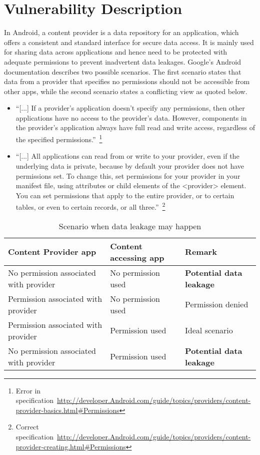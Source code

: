 \section{Vulnerability Description}
\label{vuln}
\noindent
In Android, a content provider is a data repository for an application, which offers a consistent and standard interface for secure data access. It is mainly used for sharing data across applications and hence need to be protected with adequate permissions to prevent inadvertent data leakages. Google's Android documentation describes two possible scenarios. The first scenario states that data from a provider that specifies no permissions should not be accessible from other apps, while the second scenario states a conflicting view as quoted below.
\begin{itemize}
 \item ``[...] If a provider's application doesn't specify any permissions, then other applications have no access to the provider's data. However, components in the provider's application always have full read and write access, regardless of the specified permissions.''~\footnote{Error in specification~\url{http://developer.Android.com/guide/topics/providers/content-provider-basics.html#Permissions}}
 \item ``[...] All applications can read from or write to your provider, even if the underlying data is private, because by default your provider does not have permissions set. To change this, set permissions for your provider in your manifest file, using attributes or child elements of the <provider> element. You can set permissions that apply to the entire provider, or to certain tables, or even to certain records, or all three.''~\footnote{Correct specification~\url{http://developer.Android.com/guide/topics/providers/content-provider-creating.html#Permissions}}
\end{itemize}
\begin{center}
	\begin{table}
		\label{tableErrors}
		\begin{tabular}{ | p{2.5cm} | p{2.5cm} | p{2cm} | }
			\hline
			\textbf{Content Provider app} & \textbf{Content accessing app} & \textbf{Remark} \\
			\hline \hline
			No permission associated with provider & No permission used & \textcolor[rgb]{1,0,0}{\textbf{Potential data leakage}} \\
			\hline
			Permission associated with provider & No permission used & Permission denied \\
			\hline
			Permission associated with provider & Permission used & Ideal scenario \\
			\hline
			No permission associated with provider & Permission used & \textcolor[rgb]{1,0,0}{\textbf{Potential data leakage}} \\
			\hline
		\end{tabular}
		\caption{Scenario when data leakage may happen}
	\end{table}
\end{center}
